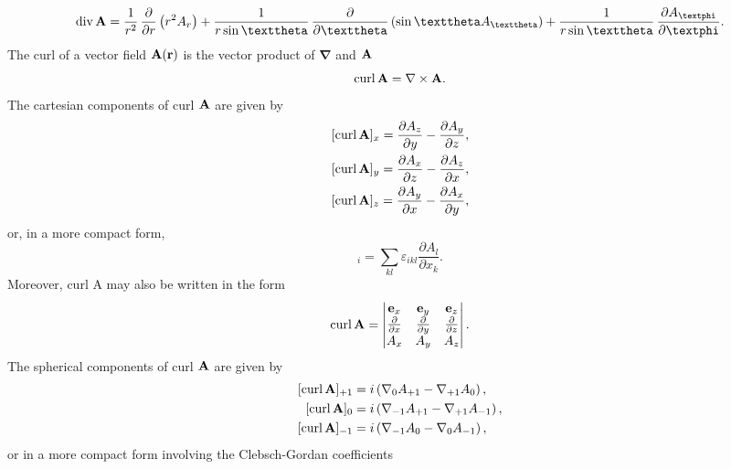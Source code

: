 \begin{equation}
\diver  \vect{A}=\frac{1}{r^{2}} \, \frac{\partial}{\partial r}\left(r^{2} A_{r}\right)+\frac{1}{r \sin \vartheta} \, \frac{\partial}{\partial \vartheta}\left(\sin \vartheta A_{\vartheta}\right)+\frac{1}{r \sin \vartheta} \, \frac{\partial A_{\varphi}}{\partial \varphi} . \label{eq:1:3:23}
\end{equation}
The curl of a vector field \(\mathbf{A}(\mathbf{r})\) is the vector product of \(\boldsymbol{\nabla}\) and \(\mathbf{A}\)
\begin{equation}
\operatorname{curl}  \mathbf{A}=\nabla \times \mathbf{A} .\label{eq:1:3:24}
\end{equation}
The cartesian components of curl \(\mathbf{A}\) are given by
\begin{align}
& {[\operatorname{curl}  \mathbf{A}]_{x}=\frac{\partial A_{z}}{\partial y}-\frac{\partial A_{y}}{\partial z}}  ,\notag\\
& {[\operatorname{curl}  \mathbf{A}]_{y}=\frac{\partial A_{x}}{\partial z}-\frac{\partial A_{z}}{\partial x}} , \label{eq:1:3:25}\\
& {[\operatorname{curl}  \mathbf{A}]_{z}=\frac{\partial A_{y}}{\partial x}-\frac{\partial A_{x}}{\partial y}} ,\notag
\end{align}
or, in a more compact form,
\begin{equation}
[\curl  \vect{A}]_{i}=\sum_{k l} \varepsilon_{i k l} \frac{\partial A_{l}}{\partial x_{k}}. \label{eq:1:3:26}
\end{equation}
Moreover, curl A may also be written in the form
\begin{equation}
\operatorname{curl}  \mathbf{A}=\begin{vmatrix}
\mathbf{e}_{x} & \mathbf{e}_{y} & \mathbf{e}_{z}  \\
\frac{\partial}{\partial x} & \frac{\partial}{\partial y} & \frac{\partial}{\partial z} \\
A_{x} & A_{y} & A_{z}
\end{vmatrix} . \label{eq:1:3:27}
\end{equation}
The spherical components of curl \(\mathbf{A}\) are given by
\begin{align}
{[\operatorname{curl}\mathbf{A}]_{+1} } & =i\left(\nabla_{0} A_{+1}-\nabla_{+1} A_{0}\right),  \notag\\
{[\operatorname{curl}  \mathbf{A}]_{0} } & =i\left(\nabla_{-1} A_{+1}-\nabla_{+1} A_{-1}\right),  \label{eq:1:3:28}\\
{[\operatorname{curl}  \mathbf{A}]_{-1} } & =i\left(\nabla_{-1} A_{0}-\nabla_{0} A_{-1}\right), \notag
\end{align}
or in a more compact form involving the Clebsch-Gordan coefficients
